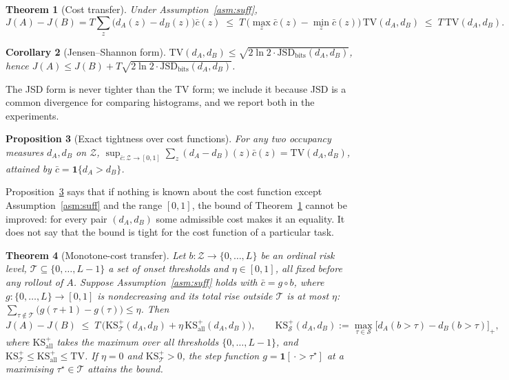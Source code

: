 \documentclass{article}
\newtheorem{theorem}{Theorem}
\newtheorem{proposition}[theorem]{Proposition}
\newtheorem{corollary}[theorem]{Corollary}
\newcommand{\TV}{\mathrm{TV}}
\newcommand{\JSD}{\mathrm{JSD}}
\begin{document}
\begin{theorem}[Cost transfer]\label{thm:main}
Under Assumption~\ref{asm:suff},
\[
J(A)-J(B)=T\sum_z\bigl(d_A(z)-d_B(z)\bigr)\bar c(z)\;\le\;T\,\bigl(\max_z\bar c(z)-\min_z\bar c(z)\bigr)\,\TV(d_A,d_B)\;\le\;T\,\TV(d_A,d_B).
\]
\end{theorem}

\begin{corollary}[Jensen--Shannon form]\label{cor:jsd}
$\TV(d_A,d_B)\le\sqrt{2\ln 2\cdot\JSD_{\text{bits}}(d_A,d_B)}$, hence $J(A)\le J(B)+T\sqrt{2\ln2\cdot\JSD_{\text{bits}}(d_A,d_B)}$.
\end{corollary}

The JSD form is never tighter than the TV form; we include it because JSD is a common divergence for comparing histograms, and we report both in the experiments.

\begin{proposition}[Exact tightness over cost functions]\label{prop:tight}
For any two occupancy measures $d_A,d_B$ on $\mathcal Z$, $\sup_{\bar c:\mathcal Z\to[0,1]}\sum_z(d_A-d_B)(z)\bar c(z)=\TV(d_A,d_B)$, attained by $\bar c=\mathbf 1\{d_A>d_B\}$.
\end{proposition}

Proposition~\ref{prop:tight} says that if nothing is known about the cost function except Assumption~\ref{asm:suff} and the range $[0,1]$, the bound of Theorem~\ref{thm:main} cannot be improved: for every pair $(d_A,d_B)$ some admissible cost makes it an equality. It does not say that the bound is tight for the cost function of a particular task.

\begin{theorem}[Monotone-cost transfer]\label{thm:mono}
Let $b:\mathcal Z\to\{0,\dots,L\}$ be an ordinal \emph{risk level}, $\mathcal T\subseteq\{0,\dots,L-1\}$ a set of \emph{onset thresholds} and $\eta\in[0,1]$, all fixed before any rollout of $A$. Suppose Assumption~\ref{asm:suff} holds with $\bar c=g\circ b$, where $g:\{0,\dots,L\}\to[0,1]$ is nondecreasing and its total rise outside $\mathcal T$ is at most $\eta$: $\sum_{\tau\notin\mathcal T}\bigl(g(\tau+1)-g(\tau)\bigr)\le\eta$. Then
\[
J(A)-J(B)\;\le\;T\,\bigl(\mathrm{KS}^+_{\mathcal T}(d_A,d_B)+\eta\,\mathrm{KS}^+_{\mathrm{all}}(d_A,d_B)\bigr),\qquad
\mathrm{KS}^+_{\mathcal S}(d_A,d_B):=\max_{\tau\in\mathcal S}\bigl[d_A(b>\tau)-d_B(b>\tau)\bigr]_+ ,
\]
where $\mathrm{KS}^+_{\mathrm{all}}$ takes the maximum over all thresholds $\{0,\dots,L-1\}$, and $\mathrm{KS}^+_{\mathcal T}\le\mathrm{KS}^+_{\mathrm{all}}\le\TV$. If $\eta=0$ and $\mathrm{KS}^+_{\mathcal T}>0$, the step function $g=\mathbf 1[\,\cdot>\tau^\star]$ at a maximising $\tau^\star\in\mathcal T$ attains the bound.
\end{theorem}
\end{document}
